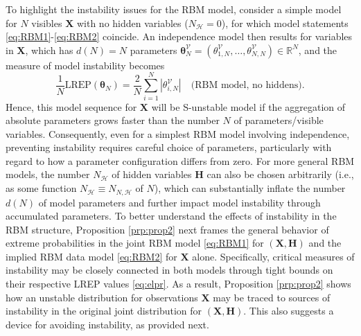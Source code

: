 \documentclass[12pt]{article}
\theoremstyle{definition}
\newcommand{\REP}{\mathrm{LREP}}
\begin{document}
To highlight the instability issues for the RBM model, consider a simple
model for \(N\) visibles \(\boldsymbol X\) with no hidden variables
(\(N_{\mathcal{H}}=0\)), for which model statements
\eqref{eq:RBM1}-\eqref{eq:RBM2} coincide. An independence model then results
for variables in \(\boldsymbol X\), which has \(d(N)=N\) parameters
\(\boldsymbol \theta_N^{\mathcal{V}} = (\theta_{1,N}^{\mathcal{V}}, \ldots, \theta_{N,N}^{\mathcal{V}}) \in \mathbb{R}^{N}\),
and the measure of model instability becomes \[
\frac{1}{N}\REP(\boldsymbol \theta_N) = \frac{2}{N} \sum_{i=1}^N|\theta_{i,N}^{\mathcal{V}}| \quad \mbox{(RBM model, no hiddens)}.
\] Hence, this model sequence for \(\boldsymbol X\) will be S-unstable
model if the aggregation of absolute parameters grows faster than the
number \(N\) of parameters/visible variables. Consequently, even for a
simplest RBM model involving independence, preventing instability
requires careful choice of parameters, particularly with regard to how a
parameter configuration differs from zero. For more general RBM models,
the number \(N_{\mathcal{H}}\) of hidden variables \(\boldsymbol H\) can
also be chosen arbitrarily (i.e., as some function
\(N_{\mathcal{H}}\equiv N_{N,\mathcal{H}}\) of \(N\)), which can
substantially inflate the number \(d(N)\) of model parameters and
further impact model instability through accumulated parameters. To
better understand the effects of instability in the RBM structure,
Proposition \ref{prp:prop2} next frames the general behavior of extreme
probabilities in the joint RBM model \eqref{eq:RBM1} for
\((\boldsymbol X, \boldsymbol H)\) and the implied RBM data model
\eqref{eq:RBM2} for \(\boldsymbol X\) alone. Specifically, critical
measures of instability may be closely connected in both models through
tight bounds on their respective LREP values \eqref{eq:elpr}. As a result,
Proposition \ref{prp:prop2} shows how an unstable distribution for
observations \(\boldsymbol X\) may be traced to sources of instability
in the original joint distribution for
\((\boldsymbol X,\boldsymbol H)\). This also suggests a device for
avoiding instability, as provided next.
\end{document}
